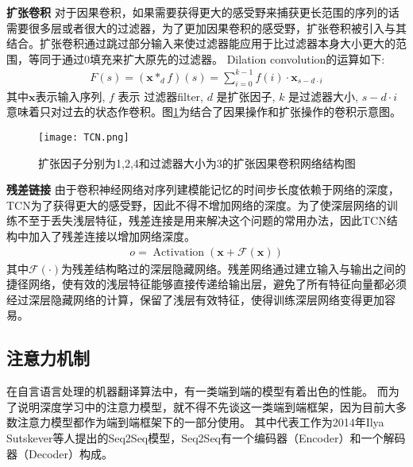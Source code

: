 \textbf{扩张卷积}
对于因果卷积，如果需要获得更大的感受野来捕获更长范围的序列的话需要很多层或者很大的过滤器，为了更加因果卷积的感受野，扩张卷积被引入与其结合。扩张卷积通过跳过部分输入来使过滤器能应用于比过滤器本身大小更大的范围，等同于通过0填充来扩大原先的过滤器。
Dilation convolution的运算如下:
\begin{align}
  F(s)=\left(\mathbf{x} *_{d} f\right)(s)=\sum_{i=0}^{k-1} f(i) \cdot \mathbf{x}_{s-d \cdot i}
\end{align}
其中$\mathbf {x}$表示输入序列, $f$ 表示 过滤器filter, $d$ 是扩张因子,%
 $k$ 是过滤器大小,  $s-d\cdot i$意味着只对过去的状态作卷积。图\ref{fig:TCN}为结合了因果操作和扩张操作的卷积示意图。
\begin{figure}[htb]
  \centering
  \texttt{[image: TCN.png]}\\
  \caption{扩张因子分别为1,2,4和过滤器大小为3的扩张因果卷积网络结构图}
  \label{fig:TCN}
\end{figure}

\textbf{残差链接}
由于卷积神经网络对序列建模能记忆的时间步长度依赖于网络的深度，TCN为了获得更大的感受野，因此不得不增加网络的深度。为了使深层网络的训练不至于丢失浅层特征，残差连接是用来解决这个问题的常用办法，因此TCN结构中加入了残差连接以增加网络深度。
\begin{align}
  o=\operatorname{Activation}(\mathbf{x}+\mathcal{F}(\mathbf{x}))
\end{align}
其中$\mathcal{F}(\cdot)$为残差结构略过的深层隐藏网络。残差网络通过建立输入与输出之间的捷径网络，使有效的浅层特征能够直接传递给输出层，避免了所有特征向量都必须经过深层隐藏网络的计算，保留了浅层有效特征，使得训练深层网络变得更加容易。



\subsection{注意力机制}
在自言语言处理的机器翻译算法中，有一类端到端的模型有着出色的性能。
而为了说明深度学习中的注意力模型，就不得不先谈这一类端到端框架，因为目前大多数注意力模型都作为端到端框架下的一部分使用。
其中代表工作为2014年Ilya Sutskever等人提出的Seq2Seq模型，Seq2Seq有一个编码器（Encoder）和一个解码器（Decoder）构成。

